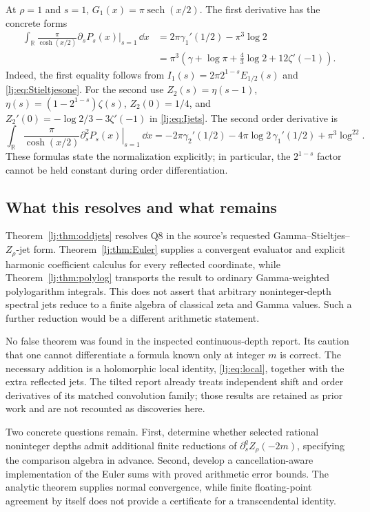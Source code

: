 At $\rho=1$ and $s=1$, $G_1(x)=\pi\operatorname{sech}(x/2)$.
The first derivative has the concrete forms
\begin{align}
 \int_{\mathbb R}\frac{\pi}{\cosh(x/2)}
       \left.\partial_sP_s(x)\right|_{s=1}\,\dd x
 &=2\pi\gamma_1'(1/2)-\pi^3\log2
 \label{lj:eq:exampleStieltjes}\\
 &=\pi^3\left(\gamma+\log\pi+
                  \frac43\log2+12\zeta'(-1)\right).
 \label{lj:eq:exampleZeta}
\end{align}
Indeed, the first equality follows from
$I_1(s)=2\pi2^{1-s}E_{1/2}(s)$ and
\eqref{lj:eq:Stieltjesone}. For the second use
$Z_2(s)=\eta(s-1)$,
$\eta(s)=(1-2^{1-s})\zeta(s)$,
$Z_2(0)=1/4$, and
$Z_2'(0)=-\log2/3-3\zeta'(-1)$ in
\eqref{lj:eq:Ijets}. The second order derivative is
\begin{equation}
 \int_{\mathbb R}\frac{\pi}{\cosh(x/2)}
       \left.\partial_s^2P_s(x)\right|_{s=1}\,\dd x
 =-2\pi\gamma_2'(1/2)-4\pi\log2\,\gamma_1'(1/2)
       +\pi^3\log^22.
 \label{lj:eq:exampleSecond}
\end{equation}
These formulas state the normalization explicitly; in particular, the
$2^{1-s}$ factor cannot be held constant during order differentiation.

\subsection{What this resolves and what remains}

Theorem~\ref{lj:thm:oddjets} resolves Q8 in the source's requested
Gamma--Stieltjes--$Z_\rho$-jet form. Theorem~\ref{lj:thm:Euler} supplies
a convergent evaluator and explicit harmonic coefficient calculus for
every reflected coordinate, while Theorem~\ref{lj:thm:polylog} transports
the result to ordinary Gamma-weighted polylogarithm integrals. This does
not assert that arbitrary noninteger-depth spectral jets reduce to a
finite algebra of classical zeta and Gamma values. Such a further
reduction would be a different arithmetic statement.

No false theorem was found in the inspected continuous-depth report.
Its caution that one cannot differentiate a formula known only at
integer $m$ is correct. The necessary addition is a holomorphic local
identity, \eqref{lj:eq:local}, together with the extra reflected jets.
The tilted report already treats independent shift and order derivatives
of its matched convolution family; those results are retained as prior
work and are not recounted as discoveries here.

Two concrete questions remain. First, determine whether selected rational
noninteger depths admit additional finite reductions of
$\partial_s^qZ_\rho(-2m)$, specifying the comparison algebra in advance.
Second, develop a cancellation-aware implementation of the Euler sums
with proved arithmetic error bounds. The analytic theorem supplies
normal convergence, while finite floating-point agreement by itself
does not provide a certificate for a transcendental identity.
